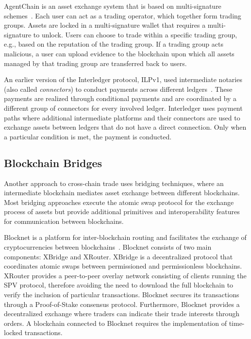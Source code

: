 AgentChain is an asset exchange system that is based on multi-signature schemes~\cite{li2019agentchain}.
Each user can act as a trading operator, which together form trading groups.
Assets are locked in a multi-signature wallet that requires a multi-signature to unlock.
Users can choose to trade within a specific trading group, e.g., based on the reputation of the trading group.
If a trading group acts malicious, a user can upload evidence to the blockchain upon which all assets managed by that trading group are transferred back to users.

An earlier version of the Interledger protocol, ILPv1, used intermediate notaries (also called \emph{connectors}) to conduct payments across different ledgers~\cite{thomas2015protocol}.
These payments are realized through conditional payments and are coordinated by a different group of connectors for every involved ledger.
Interledger uses payment paths where additional intermediate platforms and their connectors are used to exchange assets between ledgers that do not have a direct connection.
Only when a particular condition is met, the payment is conducted.


\subsection{Blockchain Bridges}
Another approach to cross-chain trade uses bridging techniques, where an intermediate blockchain mediates asset exchange between different blockchains.
Most bridging approaches execute the atomic swap protocol for the exchange process of assets but provide additional primitives and interoperability features for communication between blockchains.

Blocknet is a platform for inter-blockchain routing and facilitates the exchange of cryptocurrencies between blockchains~\cite{culwick2019blocknet}.
Blocknet consists of two main components: XBridge and XRouter.
XBridge is a decentralized protocol that coordinates atomic swaps between permissioned and permissionless blockchains.
XRouter provides a peer-to-peer overlay network consisting of clients running the SPV protocol, therefore avoiding the need to download the full blockchain to verify the inclusion of particular transactions.
Blocknet secures its transactions through a Proof-of-Stake consensus protocol.
Furthermore, Blocknet provides a decentralized exchange where traders can indicate their trade interests through orders.
A blockchain connected to Blocknet requires the implementation of time-locked transactions.

